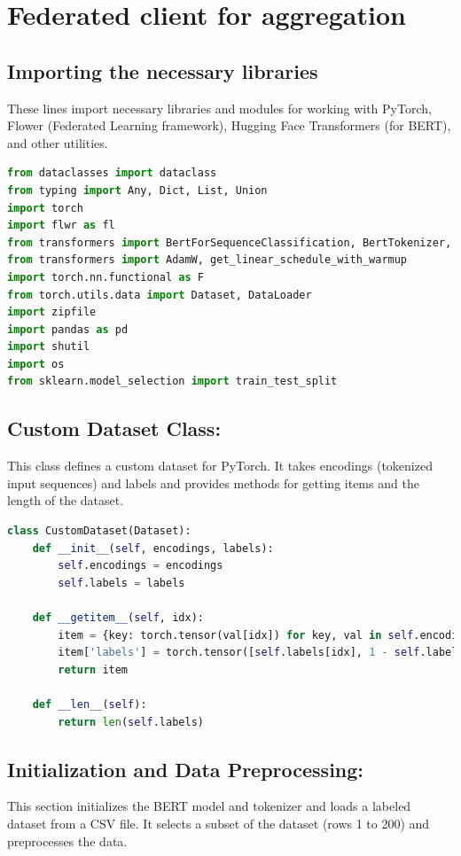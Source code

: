 \documentclass{article}
\begin{document}
\section{Federated client for aggregation}
\subsection{Importing the necessary libraries}
These lines import necessary libraries and modules for working with PyTorch, Flower (Federated Learning framework), Hugging Face Transformers (for BERT), and other utilities.
\begin{lstlisting}[language=Python, caption={Hdfs Client for aggregation}, label=code:Hdfs client]
from dataclasses import dataclass
from typing import Any, Dict, List, Union
import torch
import flwr as fl
from transformers import BertForSequenceClassification, BertTokenizer, Trainer, TrainingArguments
from transformers import AdamW, get_linear_schedule_with_warmup
import torch.nn.functional as F
from torch.utils.data import Dataset, DataLoader
import zipfile
import pandas as pd
import shutil
import os
from sklearn.model_selection import train_test_split
\end{lstlisting}

\subsection{Custom Dataset Class:}
This class defines a custom dataset for PyTorch. It takes encodings (tokenized input sequences) and labels and provides methods for getting items and the length of the dataset.

\begin{lstlisting}[language=Python]
class CustomDataset(Dataset):
    def __init__(self, encodings, labels):
        self.encodings = encodings
        self.labels = labels

    def __getitem__(self, idx):
        item = {key: torch.tensor(val[idx]) for key, val in self.encodings.items()}
        item['labels'] = torch.tensor([self.labels[idx], 1 - self.labels[idx]]).float()
        return item

    def __len__(self):
        return len(self.labels)
\end{lstlisting}

\subsection{Initialization and Data Preprocessing:}
This section initializes the BERT model and tokenizer and loads a labeled dataset from a CSV file. It selects a subset of the dataset (rows 1 to 200) and preprocesses the data.
\end{document}
